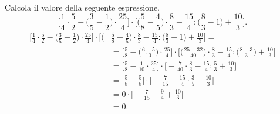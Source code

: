 \begin{esempio}
  Calcola il valore della seguente espressione.
\[\bigg[\frac{1}{4}\cdot\frac{5}{2}-\bigg(\frac{3}{5} - \frac{1}{2}\bigg)\cdot\frac{25}{4}\bigg]\cdot\bigg[\bigg(\frac{5}{8}-\frac{4}{5}\bigg)\cdot\frac{8}{3}-\frac{15}{4}:\bigg(\frac{8}{3}-1\bigg)+\frac{10}{3}\bigg].\]
  \begin{align*}
\bigg[\frac{1}{4}\cdot\frac{5}{2}-\bigg(\frac{3}{5} - \frac{1}{2}\bigg)\cdot\frac{25}{4}\bigg]\cdot\bigg[\bigg(&\frac{5}{8}-\frac{4}{5}\bigg)\cdot\frac{8}{3}-\frac{15}{4}:\bigg(\frac{8}{3}-1\bigg)+\frac{10}{3}\bigg]=\\
&=\bigg[\frac{5}{8}-\bigg(\frac{6-5}{10}\bigg)\cdot\frac{25}{4}\bigg]\cdot\bigg[\bigg(\frac{25-32}{40}\bigg)\cdot\frac{8}{3}-\frac{15}{4}:\bigg(\frac{8-3}{3}\bigg)+\frac{10}{3}\bigg]\\
&=\bigg[\frac{5}{8}-\frac{1}{10}\cdot\frac{25}{4}\bigg]\cdot\bigg[-\frac{7}{40}\cdot\frac{8}{3}-\frac{15}{4}:\frac{5}{3}+\frac{10}{3}\bigg]\\
&=\bigg[\frac{5}{8}-\frac{5}{8}\bigg]\cdot\bigg[-\frac{7}{15}-\frac{15}{4}\cdot\frac{3}{5}+\frac{10}{3}\bigg]\\
&=0\cdot\bigg[-\frac{7}{15}-\frac{9}{4}+\frac{10}{3}\bigg]\\
&=0.
  \end{align*}
\end{esempio}

